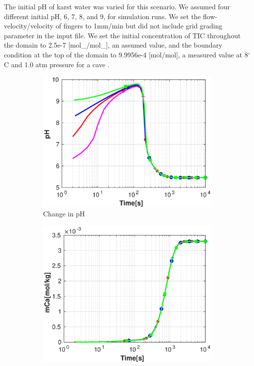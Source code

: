 The initial pH of karst water was varied for this scenario. We assumed four different initial pH, 6, 7, 8, and 9, 
for simulation runs. We set the flow-velocity/velocity of  fingers to 1mm/min but did not include grid grading 
parameter in the input file. We set the initial concentration of TIC throughout the domain to 2.5e-7 [mol\_/mol\_], 
an assumed value, and the boundary condition at the top of the domain to 9.9956e-4 [mol/mol], a measured value at 8$^{\circ}$C 
and 1.0 atm pressure for a cave \cite{Class2020}. \\

\begin{figure}[!h]
        \centering
    \begin{subfigure}{.5\linewidth}
            \centering
        \includegraphics[width=\textwidth]{PICTURES/with_pH_pH.eps}
        \caption{\small Change in pH}
        \label{fig:pHpH}
    \end{subfigure}%
        \hfill
    \begin{subfigure}{.5\linewidth}
            \centering
        \includegraphics[width=\textwidth]{PICTURES/with_pH_mCa.eps}

\end{subfigure}
\end{figure}
